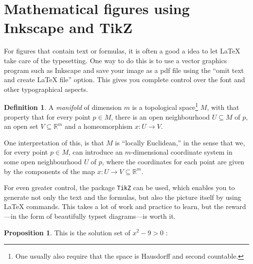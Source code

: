 \documentclass[11pt,letterpaper,titlepage]{article}
\numberwithin{equation}{section}
\numberwithin{figure}{section}
\numberwithin{table}{section}
\numberwithin{algorithm}{section}
\theoremstyle{definition}
\newtheorem{definition}[theorem]{Definition} %
\newtheorem{proposition}[theorem]{Proposition}
\newcommand{\RR}{\mathbb{R}}
\begin{document}
\section{Mathematical figures using Inkscape and TikZ}

For figures that contain text or formulas, it is often a good a idea to let {\LaTeX} take care of the typesetting. One way to do this is to use a vector graphics program such as Inkscape and save your image as a pdf file using the ``omit text and create {\LaTeX} file'' option. This gives you complete control over the font and other typographical aspects.

\begin{definition}
    A \emph{manifold} of dimension $m$ is a topological space\footnote{One usually also require that the space is Hausdorff and second countable.} $M$, with that property that for every point $p\in M$, there is an open neighbourhood $U\subseteq M$ of $p$, an open set $V\subseteq \RR^m$ and a homeomorphism $x\colon U\to V$.
    \begin{center}
    \footnotesize
    \def\svgwidth{0.8\linewidth}
    
    \end{center}
    One interpretation of this, is that $M$ is ``locally Euclidean,'' in the sense that we, for every point $p\in M$, can introduce an $m$-dimensional coordinate system in some open neighbourhood $U$ of $p$, where the coordinates for each point are given by the components of the map $x\colon U\to V\subseteq\RR^m$.
\end{definition}

For even greater control, the package \verb$TikZ$ can be used, which enables you to generate not only the text and the formulas, but also the picture itself by using {\LaTeX} commands. This takes a lot of work and practice to learn, but the reward---in the form of beautifully typset diagrams---is worth it.

\begin{proposition}
    This is the solution set of $x^2-9>0$ :

    \begin{center}
    \end{center}
\end{proposition}
\end{document}
